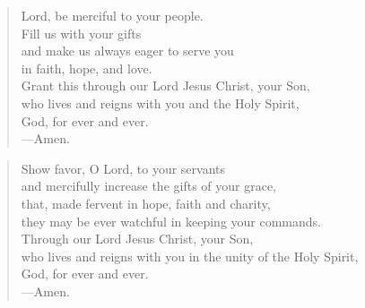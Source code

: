 \prayer

\setlength{\leftmargini}{\prayerleftmargini}

\begin{verse}
Lord, be merciful to your people.\\
Fill us with your gifts\\
and make us always eager to serve you\\
in faith, hope, and love.\\
Grant this through our Lord Jesus Christ, your Son,\\
who lives and reigns with you and the Holy Spirit,\\
God, for ever and ever.\\
{\color{red}---\thinspace}Amen.
\end{verse}


\begin{verse}
Show favor, O Lord, to your servants\\
and mercifully increase the gifts of your grace,\\
that, made fervent in hope, faith and charity,\\
they may be ever watchful in keeping your commands.\\
Through our Lord Jesus Christ, your Son,\\
who lives and reigns with you in the unity of the Holy Spirit,\\
God, for ever and ever.\\
{\color{red}---\thinspace}Amen.
\end{verse}

\setlength{\leftmargini}{\defleftmargini}